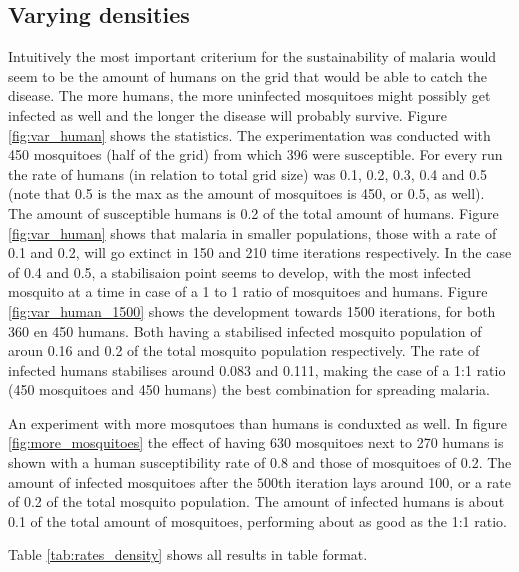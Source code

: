 \documentclass[a4paper]{report}
\begin{document}
\subsection{Varying densities} 
Intuitively the most important criterium for the sustainability of malaria would
seem to be the amount of humans on the grid that would be able to catch the
disease. The more humans, the more uninfected mosquitoes might possibly get
infected as well and the longer the disease will probably survive. Figure
\ref{fig:var_human} shows the statistics. The
experimentation was conducted  with 450 mosquitoes (half of the grid) from which
396 were susceptible.  For every run the rate of humans (in relation to total
grid size) was 0.1, 0.2, 0.3, 0.4
and 0.5 (note that 0.5 is the max as the amount of mosquitoes is 450, or 0.5, as
well). The amount of susceptible humans is 0.2 of the total amount of humans.
Figure \ref{fig:var_human} shows that malaria in smaller populations, those
with a rate of 0.1 and 0.2, will go extinct in 150 and 210 time iterations
respectively. In the case of 0.4 and 0.5, a stabilisaion point seems to
develop, with the most infected mosquito at a time in case of a 1 to 1 ratio of
mosquitoes and humans. Figure \ref{fig:var_human_1500} shows the development towards 1500
iterations, for both 360 en 450 humans. Both having a stabilised infected
mosquito population of aroun 0.16 and 0.2 of the total mosquito population
respectively. The rate of infected humans stabilises around 0.083 and  0.111,
making the case of a 1:1 ratio (450 mosquitoes and 450 humans) the best
combination for spreading malaria.

An experiment with more mosqutoes than humans is conduxted as well. In figure
\ref{fig:more_mosquitoes}
the effect of having 630 mosquitoes next to 270 humans is shown with a human
susceptibility rate of 0.8 and those of mosquitoes of 0.2. The amount
of infected mosquitoes after the $500$th iteration lays around 100, or a rate
of 0.2 of the total mosquito population. The amount of infected humans
is about 0.1 of the total amount of mosquitoes, performing about as good as the
1:1 ratio.

Table \ref{tab:rates_density} shows all results in table format.
\end{document}

